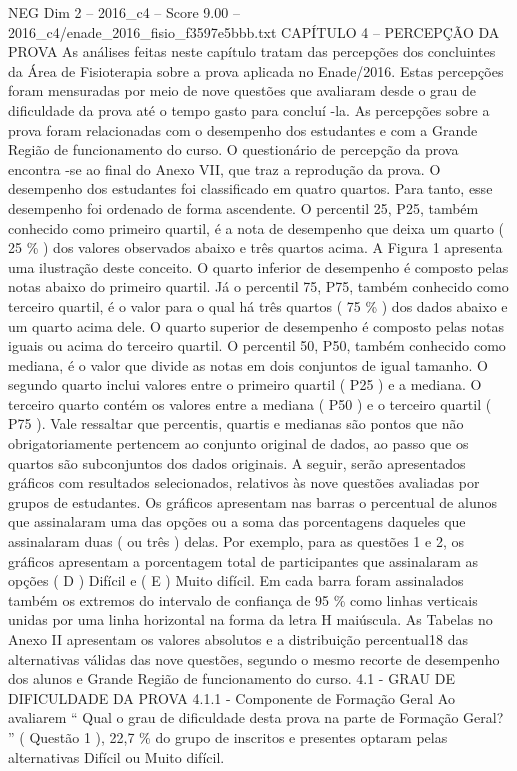 \begin{textsample}{NEG Dim 2 – 2016\_c4 – Score 9.00 – 2016\_c4/enade\_2016\_fisio\_f3597e5bbb.txt}  \label{ex:f2_neg_355}
CAPÍTULO 4 – PERCEPÇÃO DA PROVA As análises feitas neste capítulo tratam das percepções dos concluintes da Área de Fisioterapia sobre a prova aplicada no Enade/2016.
Estas percepções foram mensuradas por meio de nove questões que avaliaram desde o grau de dificuldade da prova até o tempo gasto para concluí -la.
As percepções sobre a prova foram relacionadas com o desempenho dos estudantes e com a Grande Região de funcionamento do curso.
O questionário de percepção da prova encontra -se ao final do Anexo VII, que traz a reprodução da prova.
O desempenho dos estudantes foi classificado em quatro quartos.
Para tanto, esse desempenho foi ordenado de forma ascendente.
O percentil 25, P25, também conhecido como primeiro quartil, é a nota de desempenho que deixa um quarto ( 25 \% ) dos valores observados abaixo e três quartos acima.
A Figura 1 apresenta uma ilustração deste conceito.
O quarto inferior de desempenho é composto pelas notas abaixo do primeiro quartil.
Já o percentil 75, P75, também conhecido como terceiro quartil, é o valor para o qual há três quartos ( 75 \% ) dos dados abaixo e um quarto acima dele.
O quarto superior de desempenho é composto pelas notas iguais ou acima do terceiro quartil.
O percentil 50, P50, também conhecido como mediana, é o valor que divide as notas em dois conjuntos de igual tamanho.
O segundo quarto inclui valores entre o primeiro quartil ( P25 ) e a mediana.
O terceiro quarto contém os valores entre a mediana ( P50 ) e o terceiro quartil ( P75 ).
Vale ressaltar que percentis, quartis e medianas são pontos que não obrigatoriamente pertencem ao conjunto original de dados, ao passo que os quartos são subconjuntos dos dados originais.
A seguir, serão apresentados gráficos com resultados selecionados, relativos às nove questões avaliadas por grupos de estudantes.
Os gráficos apresentam nas barras o percentual de alunos que assinalaram uma das opções ou a soma das porcentagens daqueles que assinalaram duas ( ou três ) delas.
Por exemplo, para as questões 1 e 2, os gráficos apresentam a porcentagem total de participantes que assinalaram as opções ( D ) Difícil e ( E ) Muito difícil.
Em cada barra foram assinalados também os extremos do intervalo de confiança de 95 \% como linhas verticais unidas por uma linha horizontal na forma da letra H maiúscula.
As Tabelas no Anexo II apresentam os valores absolutos e a distribuição percentual18 das alternativas válidas das nove questões, segundo o mesmo recorte de desempenho dos alunos e Grande Região de funcionamento do curso. 4.1 - GRAU DE DIFICULDADE DA PROVA 4.1.1 - Componente de Formação Geral Ao avaliarem “ Qual o grau de dificuldade desta prova na parte de Formação Geral? ” ( Questão 1 ), 22,7 \% do grupo de inscritos e presentes optaram pelas alternativas Difícil ou Muito difícil.

\end{textsample}
